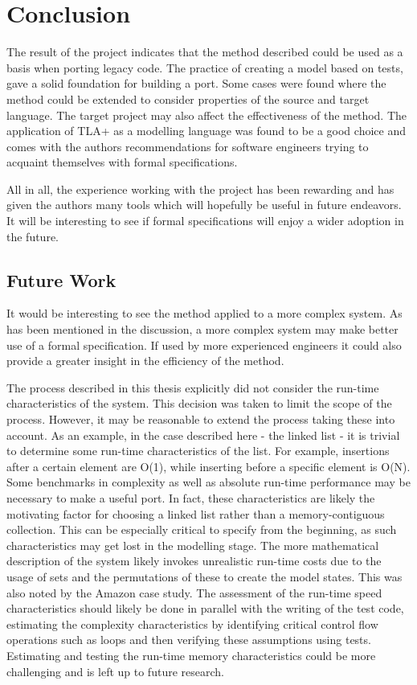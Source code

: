 \section{Conclusion}\label{conclusion}

The result of the project indicates that the method described could be used as a basis when porting legacy code. The practice of creating a model based on tests, gave a solid foundation for building a port. Some cases were found where the method could be extended to consider properties of the source and target language. The target project may also affect the effectiveness of the method. The application of TLA+ as a modelling language was found to be a good choice and comes with the authors recommendations for software engineers trying to acquaint themselves with formal specifications. 

All in all, the experience working with the project has been rewarding and has given the authors many tools which will hopefully be useful in future endeavors. It will be interesting to see if formal specifications will enjoy a wider adoption in the future.

\subsection{Future Work}
It would be interesting to see the method applied to a more complex system. As has been mentioned in the discussion, a more complex system may make better use of a formal specification. If used by more experienced engineers it could also provide a greater insight in the efficiency of the method. 

The process described in this thesis explicitly did not consider the run-time characteristics of the system. This decision was taken to limit the scope of the process. However, it may be reasonable to extend the process taking these into account. As an example, in the case described here - the linked list - it is trivial to determine some run-time characteristics of the list. For example, insertions after a certain element are O(1), while inserting before a specific element is O(N). Some benchmarks in complexity as well as absolute run-time performance may be necessary to make a useful port. In fact, these characteristics are likely the motivating factor for choosing a linked list rather than a memory-contiguous collection. This can be especially critical to specify from the beginning, as such characteristics may get lost in the modelling stage. The more mathematical description of the system likely invokes unrealistic run-time costs due to the usage of sets and the permutations of these to create the model states. This was also noted by the Amazon case study. The assessment of the run-time speed characteristics should likely be done in parallel with the writing of the test code, estimating the complexity characteristics by identifying critical control flow operations such as loops and then verifying these assumptions using tests. Estimating and testing the run-time memory characteristics could be more challenging and is left up to future research.
